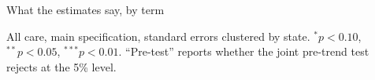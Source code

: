 \documentclass[aspectratio=169,11pt]{beamer}
\begin{document}
\begin{frame}{What the estimates say, by term}
  \vspace{0.45cm}
  \begin{center}
  {\small}
  \end{center}
  \vspace{0.55cm}
  {\footnotesize\color{WarmGray} All care, main specification, standard errors clustered by state. $^{*}p<0.10$, $^{**}p<0.05$, $^{***}p<0.01$. ``Pre-test'' reports whether the joint pre-trend test rejects at the 5\% level.}
\end{frame}
\end{document}
